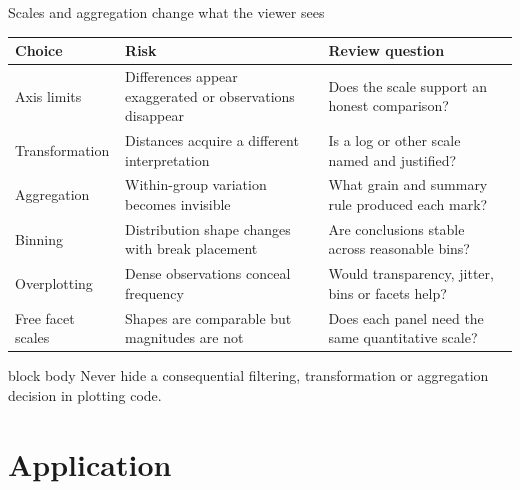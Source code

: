 \documentclass[10pt,aspectratio=169]{beamer}
\begin{document}
\begin{frame}{Scales and aggregation change what the viewer sees}

\scriptsize

\begin{tabularx}{\textwidth}{lXX}
\toprule
\textbf{Choice} & \textbf{Risk} & \textbf{Review question} \\
\midrule
Axis limits & Differences appear exaggerated or observations disappear & Does the scale support an honest comparison? \\
Transformation & Distances acquire a different interpretation & Is a log or other scale named and justified? \\
Aggregation & Within-group variation becomes invisible & What grain and summary rule produced each mark? \\
Binning & Distribution shape changes with break placement & Are conclusions stable across reasonable bins? \\
Overplotting & Dense observations conceal frequency & Would transparency, jitter, bins or facets help? \\
Free facet scales & Shapes are comparable but magnitudes are not & Does each panel need the same quantitative scale? \\
\bottomrule
\end{tabularx}

\vspace{0.38cm}

\small

\begin{beamercolorbox}[rounded=true,sep=8pt]{block body}
Never hide a consequential filtering, transformation or aggregation decision in plotting code.
\end{beamercolorbox}

\end{frame}


\section{Application}
\end{document}
